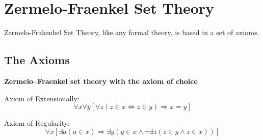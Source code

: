 \section{Zermelo-Fraenkel Set Theory}

Zermelo-Frakenkel Set Theory, like any formal theory, is based in a set of axioms.

\subsection{The Axioms}
\begin{axiomset}
    \begin{center}
        \textbf{Zermelo--Fraenkel set theory with the axiom of choice}
    \end{center}
    \begin{axiom}
        Axiom of Extensionally:
        \begin{equation}
          \forall x \forall y [ \forall z ( z \in x \Leftrightarrow z \in y) \Rightarrow x = y ]
        \end{equation}
    \end{axiom}
    \begin{axiom}
        Axiom of Regularity:
        \begin{equation}
          \forall x [ \exists a ( a \in x ) \Rightarrow \exists y ( y \in x \land \neg \exists z ( z \in y \land z \in x ))]
        \end{equation}
    \end{axiom}
\end{axiomset}

